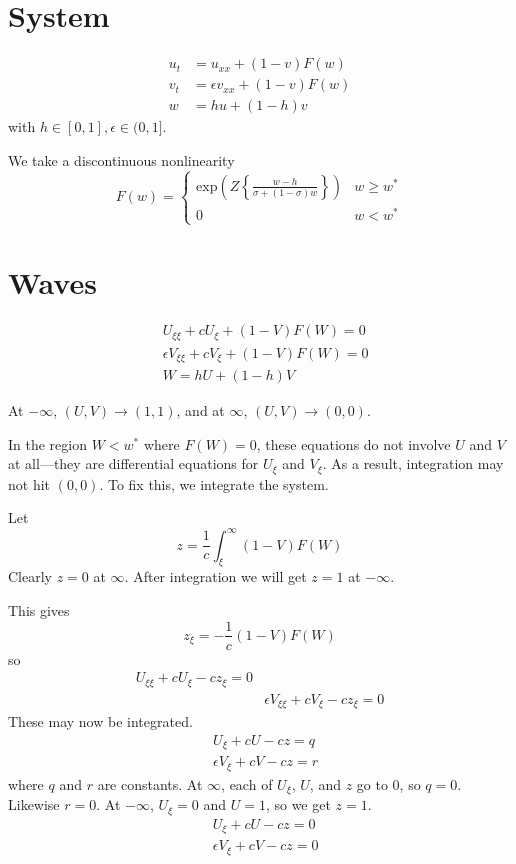 \documentclass[10pt]{article}
\begin{document}
\section{System}
\begin{align}
u_t &= u_{xx} + (1-v)F(w) \\
v_t &= \epsilon v_{xx} + (1-v)F(w)\\
w &= hu+(1-h)v
\end{align}
with $h \in [0,1], \epsilon \in (0,1]$.

We take a discontinuous nonlinearity
\begin{equation}
F(w) = \left\{\begin{array}{ll}
\mathrm{exp}\left(Z\left\{\frac{w-h}{\sigma+(1-\sigma)w} \right\} \right) & w \geq w^*\\
0 & w < w^*
\end{array} \right.
\end{equation}


\section{Waves}
\begin{align}
&U_{\xi\xi} + cU_\xi + (1-V)F(W) = 0\\
&\epsilon V_{\xi\xi} + cV_\xi + (1-V)F(W) = 0\\
&W = hU+(1-h)V
\end{align}

At $-\infty$, $(U,V) \to (1,1)$, and at $\infty$, $(U,V) \to (0,0)$.

In the region $W < w^*$ where $F(W) = 0$, these equations do not involve $U$ and $V$ at all---they are differential equations for $U_\xi$ and $V_\xi$.
As a result, integration may not hit $(0,0)$. To fix this, we integrate the system.

Let
\begin{equation}
z = \frac{1}{c}\int_\xi^\infty (1-V)F(W)
\end{equation}
Clearly $z=0$ at $\infty$.  After integration we will get $z=1$ at $-\infty$.

This gives
\begin{equation}
z_\xi = -\frac{1}{c}(1-V)F(W)
\end{equation}
so
\begin{align}
U_{\xi\xi}+cU_\xi-cz_\xi = 0\\
&\epsilon V_{\xi\xi}+cV_\xi-cz_\xi = 0
\end{align}
These may now be integrated.
\begin{align}
&U_\xi + cU - cz = q \\
&\epsilon V_\xi + cV - cz = r
\end{align}
where $q$ and $r$ are constants.
At $\infty$, each of $U_\xi$, $U$, and $z$ go to 0, so $q=0$.
Likewise $r=0$.
At $-\infty$, $U_\xi = 0$ and $U = 1$, so we get $z=1$.
\begin{align}
&U_\xi + cU - cz = 0 \\
&\epsilon V_\xi + cV - cz = 0
\end{align}
\end{document}
